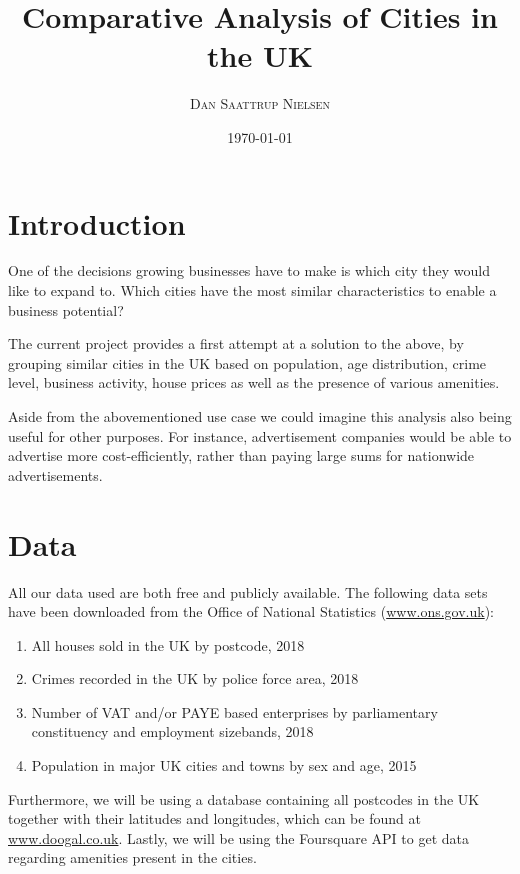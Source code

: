 \documentclass[a4paper, 11pt]{article}
\begin{document}
\title{Comparative Analysis of Cities in the UK}
\author{{\small\textsc{Dan Saattrup Nielsen}}}
\date{\today}
\maketitle



\section{Introduction}
One of the decisions growing businesses have to make is which city they would like to expand to. Which cities have the most similar characteristics to enable a business potential?

The current project provides a first attempt at a solution to the above, by grouping similar cities in the UK based on population, age distribution, crime level, business activity, house prices as well as the presence of various amenities.

Aside from the abovementioned use case we could imagine this analysis also being useful for other purposes. For instance, advertisement companies would be able to advertise more cost-efficiently, rather than paying large sums for nationwide advertisements.


\section{Data}
All our data used are both free and publicly available. The following data sets have been downloaded from the Office of National Statistics (\url{www.ons.gov.uk}):
\begin{enumerate}
  \item All houses sold in the UK by postcode, 2018
  \item Crimes recorded in the UK by police force area, 2018
  \item Number of VAT and/or PAYE based enterprises by parliamentary constituency and employment sizebands, 2018
  \item Population in major UK cities and towns by sex and age, 2015\\
\end{enumerate}

Furthermore, we will be using a database containing all postcodes in the UK together with their latitudes and longitudes, which can be found at \url{www.doogal.co.uk}. Lastly, we will be using the Foursquare API to get data regarding amenities present in the cities.
\end{document}
